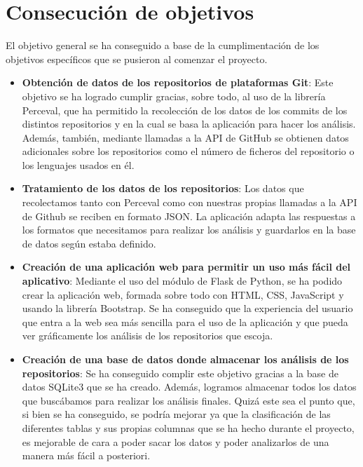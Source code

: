 \documentclass[a4paper, 12pt]{book}
\begin{document}
        \section{Consecución de objetivos}
        \label{sec:consecucion-objetivos}

        El objetivo general se ha conseguido a base de la cumplimentación de los objetivos específicos que se pusieron al comenzar el proyecto.

        \begin {itemize}
  \item \textbf {Obtención de datos de los repositorios de plataformas Git}: Este objetivo se ha logrado cumplir gracias, sobre todo, al uso de la librería Perceval, que ha permitido la recolección de los datos de los commits de los distintos repositorios y en la cual se basa la aplicación para hacer los análisis. Además, también, mediante llamadas a la API de GitHub se obtienen datos adicionales sobre los repositorios como el número de ficheros del repositorio o los lenguajes usados en él.
  \item \textbf{Tratamiento de los datos de los repositorios}: Los datos que recolectamos tanto con Perceval como con nuestras propias llamadas a la API de Github se reciben en formato JSON. La aplicación adapta las respuestas a los  formatos que necesitamos para realizar los análisis y guardarlos en la base de datos según estaba definido.
  \item \textbf{Creación de una aplicación web para permitir un uso más fácil del aplicativo}: Mediante el uso del módulo de Flask de Python, se ha podido crear la aplicación web, formada sobre todo con HTML, CSS, JavaScript y usando la librería Bootstrap. Se ha conseguido que la experiencia del usuario que entra a la web sea más sencilla para el uso de la aplicación y que pueda ver gráficamente los análisis de los repositorios que escoja.
  \item \textbf{Creación de una base de datos donde almacenar los análisis de los repositorios}: Se ha conseguido complir este objetivo gracias a la base de datos SQLite3 que se ha creado. Además, logramos almacenar todos los datos que buscábamos para realizar los análisis finales. Quizá este sea el punto que, si bien se ha conseguido, se podría mejorar ya que la clasificación de las diferentes tablas y sus propias columnas que se ha hecho durante el proyecto, es mejorable de cara a poder sacar los datos y poder analizarlos de una manera más fácil a posteriori.
\end{itemize}
\end{document}
